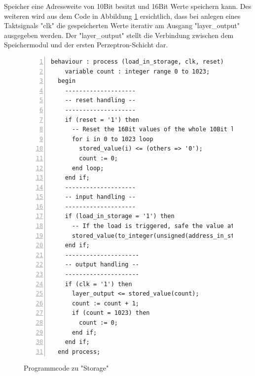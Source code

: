 \documentclass{article}
\numberwithin{equation}{section}
\begin{document}
Speicher eine Adressweite von 10Bit besitzt und 16Bit Werte speichern kann. Des weiteren 
wird aus dem Code in Abbildung \ref{code:storage} ersichtlich, dass bei anlegen eines Taktsignals  "clk" 
die gespeicherten Werte iterativ am Ausgang \linebreak "layer\_output" ausgegeben werden. Der 
"layer\_output" stellt  die Verbindung zwischen dem Speichermodul und der ersten 
Perzeptron-Schicht dar.
\begin{figure}[htbp]
\begin{lstlisting}[style=VHDL,numbers=left,stepnumber=1,basicstyle=\footnotesize]
    behaviour : process (load_in_storage, clk, reset)
    variable count : integer range 0 to 1023;
  begin
    --------------------
    -- reset handling --
    --------------------
    if (reset = '1') then
      -- Reset the 16Bit values of the whole 10Bit long array.
      for i in 0 to 1023 loop
        stored_value(i) <= (others => '0');
        count := 0;
      end loop;
    end if;
    --------------------
    -- input handling --
    --------------------
    if (load_in_storage = '1') then
      -- If the load is triggered, safe the value at the address.
      stored_value(to_integer(unsigned(address_in_storage))) <= data_in_storage;
    end if;
    ---------------------
    -- output handling --
    ---------------------
    if (clk = '1') then
      layer_output <= stored_value(count);
      count := count + 1;
      if (count = 1023) then
        count := 0;
      end if;
    end if;
  end process;
\end{lstlisting}
\caption{Programmcode zu "Storage"} \label{code:storage}
\end{figure}
\pagebreak
\end{document}
